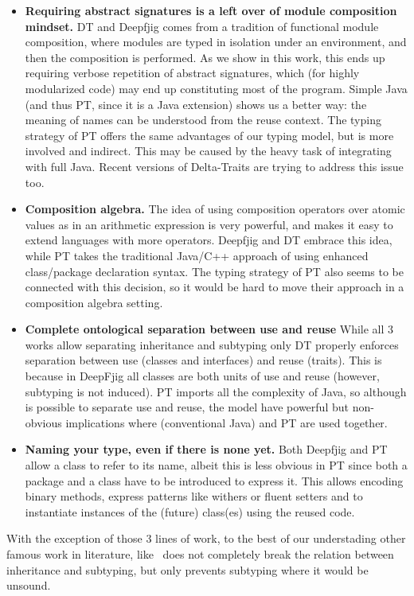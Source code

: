 \begin{itemize}
\item 
{\bf Requiring abstract signatures is a left over of module composition mindset.}
DT and Deepfjig comes from a tradition of functional module composition, where 
modules are typed in isolation under an environment, and then the composition is performed.
As we show in this work, this ends up requiring verbose repetition of abstract signatures,
which (for highly modularized code) may end up constituting most of the program.
Simple Java (and thus PT, since it is a Java extension) shows us a better way:
the meaning of names can be understood from the reuse context.
The typing strategy of PT offers the same advantages of our typing model, 
but is more involved and indirect. This may be caused by the
heavy task of integrating with full Java.
Recent versions of Delta-Traits are trying to address this issue too.
\item {\bf Composition algebra.}
The idea of using composition operators over atomic values as in an arithmetic expression is very powerful,
and makes it easy to extend languages with more operators. Deepfjig and DT embrace this idea, while PT takes the traditional Java/C++ approach of using enhanced class/package declaration syntax.
The typing strategy of PT also seems to be connected with this
decision, so it would be hard to move their approach in a composition
algebra setting.
\item {\bf Complete ontological separation between use and reuse}
While all 3 works allow separating inheritance and subtyping only DT properly enforces 
separation between use (classes and interfaces) and reuse (traits).
This is because in DeepFjig all classes are both units of use and reuse (however, subtyping is not induced).
PT imports all the complexity of Java, so although is possible to separate use and reuse, the model have powerful but non-obvious implications where (conventional Java) \Q@extends@ and PT are used together.
\item {\bf Naming your type, even if there is none yet.}
Both Deepfjig and PT allow a class to refer to its name, albeit this is
less obvious in PT since both a package and a class have to be introduced to express it.
This allows encoding binary methods, express patterns like withers or fluent setters and to instantiate instances of the (future) class(es)  using the reused code.

\end{itemize}
With the exception of those 3 lines of work, to the best of our understading
other famous work in literature, like~\cite{odersky2008programming,nystrom2006j}
does not completely break the relation between inheritance and subtyping, but only prevents subtyping where 
it would be unsound.

